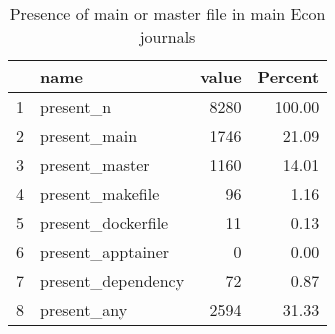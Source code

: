 \begin{table}[ht]
\centering
\caption{Presence of main or master file in main Econ journals} 
\label{tab:master}
\begin{tabular}{rlrr}
  \hline
 & name & value & Percent \\ 
  \hline
1 & present\_n & 8280 & 100.00 \\ 
  2 & present\_main & 1746 & 21.09 \\ 
  3 & present\_master & 1160 & 14.01 \\ 
  4 & present\_makefile &  96 & 1.16 \\ 
  5 & present\_dockerfile &  11 & 0.13 \\ 
  6 & present\_apptainer &   0 & 0.00 \\ 
  7 & present\_dependency &  72 & 0.87 \\ 
  8 & present\_any & 2594 & 31.33 \\ 
   \hline
\end{tabular}
\end{table}

